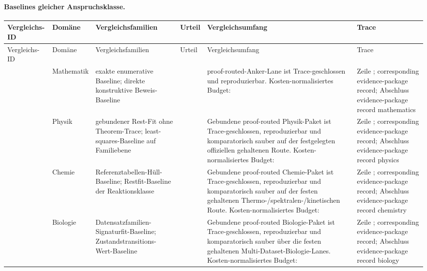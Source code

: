 \paragraph{Baselines gleicher Anspruchsklasse.}
\begingroup
\scriptsize
\setlength{\emergencystretch}{1.5em}
\setlength{\tabcolsep}{2pt}
\setlength{\LTleft}{0pt}
\setlength{\LTright}{0pt}
\begin{longtable}{@{}L{0.14\textwidth}L{0.09\textwidth}L{0.17\textwidth}L{0.10\textwidth}L{0.23\textwidth}L{0.18\textwidth}@{}}
\toprule
Vergleichs-ID & Domäne & Vergleichsfamilien & Urteil & Vergleichsumfang & Trace \\
\midrule
\endfirsthead
\toprule
Vergleichs-ID & Domäne & Vergleichsfamilien & Urteil & Vergleichsumfang & Trace \\
\midrule
\endhead
{} & Mathematik & exakte enumerative Baseline; direkte konstruktive Beweis-Baseline &  & proof-routed-Anker-Lane ist Trace-geschlossen und reproduzierbar. \allowbreak Kosten-normalisiertes Budget:  & Zeile ; corresponding evidence-package record; \allowbreak Abschluss evidence-package record mathematics \\
 & Physik & gebundener Rest-Fit ohne Theorem-Trace; least-squares-Baseline auf Familiebene &  & Gebundene proof-routed Physik-Paket ist Trace-geschlossen, reproduzierbar und komparatorisch sauber auf der festgelegten offiziellen gehaltenen Route. \allowbreak Kosten-normalisiertes Budget:  & Zeile ; corresponding evidence-package record; \allowbreak Abschluss evidence-package record physics \\
 & Chemie & Referenztabellen-Hüll-Baseline; Restfit-Baseline der Reaktionsklasse &  & Gebundene proof-routed Chemie-Paket ist Trace-geschlossen, reproduzierbar und komparatorisch sauber auf der festen gehaltenen Thermo-/spektralen-/kinetischen Route. \allowbreak Kosten-normalisiertes Budget:  & Zeile ; corresponding evidence-package record; \allowbreak Abschluss evidence-package record chemistry \\
 & Biologie & Datensatzfamilien-Signaturfit-Baseline; Zustandstransitions-Wert-Baseline &  & Gebundene proof-routed Biologie-Paket ist Trace-geschlossen, reproduzierbar und komparatorisch sauber über die festen gehaltenen Multi-Dataset-Biologie-Lanes. \allowbreak Kosten-normalisiertes Budget:  & Zeile ; corresponding evidence-package record; \allowbreak Abschluss evidence-package record biology \\

\end{longtable}
